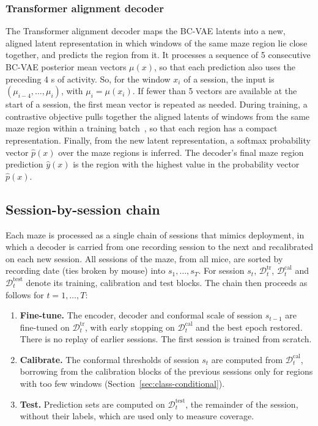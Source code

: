 \documentclass{article}
\begin{document}
\subsubsection{Transformer alignment decoder}
The Transformer alignment decoder maps the BC-VAE latents into a new, aligned latent representation in which windows of the same maze region lie close together, and predicts the region from it. It processes a sequence of 5 consecutive BC-VAE posterior mean vectors $\mu(x)$, so that each prediction also uses the preceding 4 s of activity. So, for the window $x_i$ of a session, the input is $(\mu_{i-4},\ldots,\mu_i)$, with $\mu_i=\mu(x_i)$. If fewer than 5 vectors are available at the start of a session, the first mean vector is repeated as needed. During training, a contrastive objective pulls together the aligned latents of windows from the same maze region within a training batch~\cite{schneider2023a}, so that each region has a compact representation. Finally, from the new latent representation, a softmax probability vector $\hat p(x)$ over the maze regions is inferred. The decoder’s final maze region prediction $\hat y(x)$ is the region with the highest value in the probability vector $\hat p(x)$.

\subsection{Session-by-session chain}
\label{sec:chain}
Each maze is processed as a single chain of sessions that mimics deployment, in which a decoder is carried from one recording session to the next and recalibrated on each new session. All sessions of the maze, from all mice, are sorted by recording date (ties broken by mouse) into $s_1,\ldots,s_T$. For session $s_t$, $\mathcal{D}^{\mathrm{tr}}_t$, $\mathcal{D}^{\mathrm{cal}}_t$ and $\mathcal{D}^{\mathrm{test}}_t$ denote its training, calibration and test blocks. The chain then proceeds as follows for $t=1,\ldots,T$:

\begin{enumerate}[leftmargin=*,itemsep=1pt,topsep=2pt]
  \item \textbf{Fine-tune.} The encoder, decoder and conformal scale of session $s_{t-1}$ are fine-tuned on $\mathcal{D}^{\mathrm{tr}}_t$, with early stopping on $\mathcal{D}^{\mathrm{cal}}_t$ and the best epoch restored. There is no replay of earlier sessions. The first session is trained from scratch.
  \item \textbf{Calibrate.} The conformal thresholds of session $s_t$ are computed from $\mathcal{D}^{\mathrm{cal}}_t$, borrowing from the calibration blocks of the previous sessions only for regions with too few windows (Section~\ref{sec:class-conditional}).
  \item \textbf{Test.} Prediction sets are computed on $\mathcal{D}^{\mathrm{test}}_t$, the remainder of the session, without their labels, which are used only to measure coverage.
\end{enumerate}
\end{document}
